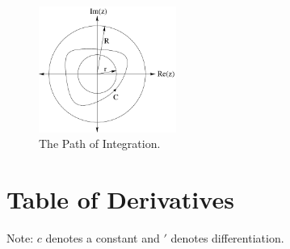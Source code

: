 




\begin{figure}[h!]
  \begin{center}
    \includegraphics[width=0.4\textwidth]{appendix/app_path_int}
  \end{center}
  \caption{The Path of Integration.}
  \label{app_path_int}
\end{figure}






\raggedbottom
\chapter{Table of Derivatives}
\label{table_of_derivatives}
\raggedbottom 


Note: $c$ denotes a constant and $'$ denotes differentiation.

